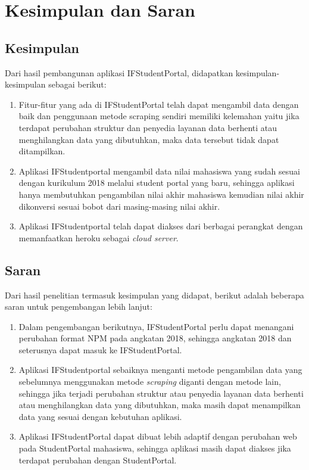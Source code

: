 \chapter{Kesimpulan dan Saran}
\label{chap:kesimpulan_saran}

\section{Kesimpulan}
\label{sec:kesimpulan}
Dari hasil pembangunan aplikasi IFStudentPortal, didapatkan kesimpulan-kesimpulan sebagai berikut:
\begin{enumerate}
	\item Fitur-fitur yang ada di IFStudentPortal telah dapat mengambil data dengan baik dan penggunaan metode scraping sendiri memiliki kelemahan yaitu jika terdapat perubahan struktur dan penyedia layanan data berhenti atau menghilangkan data yang dibutuhkan, maka data tersebut tidak dapat ditampilkan.
	\item Aplikasi IFStudentportal mengambil data nilai mahasiswa yang sudah sesuai dengan kurikulum 2018 melalui student portal yang baru, sehingga aplikasi hanya membutuhkan pengambilan nilai akhir mahasiswa kemudian nilai akhir dikonversi sesuai bobot dari masing-masing nilai akhir.
	\item Aplikasi IFStudentportal telah dapat diakses dari berbagai perangkat dengan memanfaatkan heroku sebagai \textit{cloud server}.
\end{enumerate}

\section{Saran}
\label{sec:saran}
Dari hasil penelitian termasuk kesimpulan yang didapat, berikut adalah beberapa saran untuk pengembangan lebih lanjut:
\begin{enumerate}
	\item Dalam pengembangan berikutnya, IFStudentPortal perlu dapat menangani perubahan format NPM pada angkatan 2018, sehingga angkatan 2018 dan seterusnya dapat masuk ke IFStudentPortal.
	\item Aplikasi IFStudentportal sebaiknya menganti metode pengambilan data  yang sebelumnya menggunakan metode \textit{scraping} diganti dengan metode lain, sehingga jika terjadi perubahan struktur atau penyedia layanan data berhenti atau menghilangkan data yang dibutuhkan, maka masih dapat menampilkan data yang sesuai dengan kebutuhan aplikasi.
	\item Aplikasi IFStudentPortal dapat dibuat lebih adaptif dengan perubahan web pada StudentPortal mahasiswa, sehingga aplikasi masih dapat diakses jika terdapat perubahan dengan StudentPortal.
\end{enumerate}